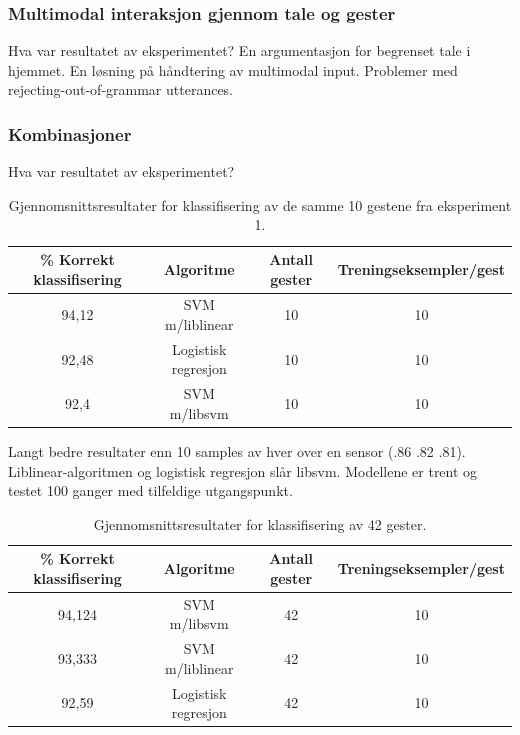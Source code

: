 \subsubsection*{Multimodal interaksjon gjennom tale og gester}
{\color{red}Hva var resultatet av eksperimentet?}
En argumentasjon for begrenset tale i hjemmet. En løsning på håndtering av multimodal input. Problemer med rejecting-out-of-grammar utterances.


\subsubsection*{Kombinasjoner}
{\color{red}Hva var resultatet av eksperimentet?}

\begin{table}[h!]
\centering
\begin{tabular}{|| c c c c ||}
\hline
\% Korrekt klassifisering & Algoritme & Antall gester & Treningseksempler/gest \\ [0.5ex] 
 \hline\hline
 94,12 & SVM m/liblinear & 10 & 10 \\ 
 \hline
 92,48 & Logistisk regresjon & 10 & 10 \\ [1ex]
 \hline
 92,4 & SVM m/libsvm & 10 & 10 \\
 \hline
\end{tabular}
\caption{Gjennomsnittsresultater for klassifisering av de samme 10 gestene fra eksperiment 1.}
\label{table:results-foursensors}
\end{table}

Langt bedre resultater enn 10 samples av hver over en sensor (.86 .82 .81). Liblinear-algoritmen og logistisk regresjon slår libsvm.  Modellene er trent og testet 100 ganger med tilfeldige utgangspunkt.

\begin{table}[h!]
\centering
\begin{tabular}{|| c c c c ||}
\hline
\% Korrekt klassifisering & Algoritme & Antall gester & Treningseksempler/gest\\ [0.5ex] 
 \hline\hline
 94,124 & SVM m/libsvm & 42 & 10 \\ 
 \hline
 93,333 & SVM m/liblinear & 42 & 10 \\
 \hline
 92,59 & Logistisk regresjon & 42 & 10 \\ [1ex]
 \hline
\end{tabular}
\caption{Gjennomsnittsresultater for klassifisering av 42 gester.}
\label{table:results-foursensors}
\end{table}

